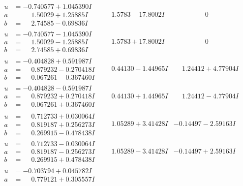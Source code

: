 \documentclass[1p]{elsarticle_modified}
\theoremstyle{definition}
\begin{document}
$$\begin{array}{c|c|c}
\begin{aligned}
u &= -0.740577 + 1.045390 I \\
a &= \phantom{-}1.50029 + 1.25885 I \\
b &= \phantom{-}2.74585 - 0.69836 I\end{aligned}
 & \phantom{-}1.5783 - 17.8002 I & \phantom{-0.000000 } 0 \\ \hline\begin{aligned}
u &= -0.740577 - 1.045390 I \\
a &= \phantom{-}1.50029 - 1.25885 I \\
b &= \phantom{-}2.74585 + 0.69836 I\end{aligned}
 & \phantom{-}1.5783 + 17.8002 I & \phantom{-0.000000 } 0 \\ \hline\begin{aligned}
u &= -0.404828 + 0.591987 I \\
a &= \phantom{-}0.879232 - 0.270418 I \\
b &= \phantom{-}0.067261 - 0.367460 I\end{aligned}
 & \phantom{-}0.44130 - 1.44965 I & \phantom{-}1.24412 + 4.77904 I \\ \hline\begin{aligned}
u &= -0.404828 - 0.591987 I \\
a &= \phantom{-}0.879232 + 0.270418 I \\
b &= \phantom{-}0.067261 + 0.367460 I\end{aligned}
 & \phantom{-}0.44130 + 1.44965 I & \phantom{-}1.24412 - 4.77904 I \\ \hline\begin{aligned}
u &= \phantom{-}0.712733 + 0.030064 I \\
a &= \phantom{-}0.819187 + 0.256273 I \\
b &= \phantom{-}0.269915 - 0.478438 I\end{aligned}
 & \phantom{-}1.05289 + 3.41428 I & -0.14497 - 2.59163 I \\ \hline\begin{aligned}
u &= \phantom{-}0.712733 - 0.030064 I \\
a &= \phantom{-}0.819187 - 0.256273 I \\
b &= \phantom{-}0.269915 + 0.478438 I\end{aligned}
 & \phantom{-}1.05289 - 3.41428 I & -0.14497 + 2.59163 I \\ \hline\begin{aligned}
u &= -0.703794 + 0.045782 I \\
a &= \phantom{-}0.779121 + 0.305557 I \\

\end{aligned}
\end{array}$$
\end{document}
